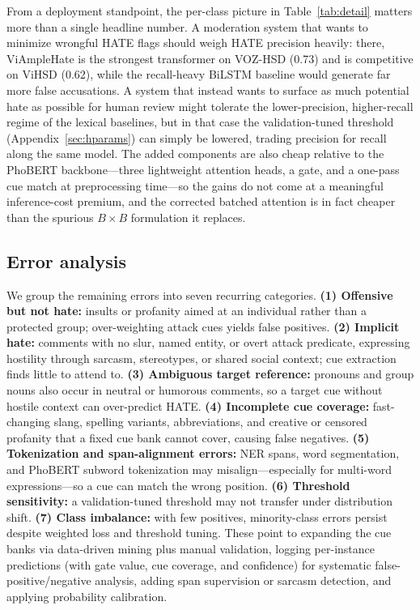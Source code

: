 \documentclass[11pt]{article}
\begin{document}
From a deployment standpoint, the per-class picture in Table~\ref{tab:detail} matters more than a single headline number. A moderation system that wants to minimize wrongful HATE flags should weigh HATE precision heavily: there, ViAmpleHate is the strongest transformer on VOZ-HSD (0.73) and is competitive on ViHSD (0.62), while the recall-heavy BiLSTM baseline would generate far more false accusations. A system that instead wants to surface as much potential hate as possible for human review might tolerate the lower-precision, higher-recall regime of the lexical baselines, but in that case the validation-tuned threshold (Appendix~\ref{sec:hparams}) can simply be lowered, trading precision for recall along the same model. The added components are also cheap relative to the PhoBERT backbone---three lightweight attention heads, a gate, and a one-pass cue match at preprocessing time---so the gains do not come at a meaningful inference-cost premium, and the corrected batched attention is in fact cheaper than the spurious $B\times B$ formulation it replaces.

\subsection{Error analysis}
We group the remaining errors into seven recurring categories. \textbf{(1) Offensive but not hate:} insults or profanity aimed at an individual rather than a protected group; over-weighting attack cues yields false positives. \textbf{(2) Implicit hate:} comments with no slur, named entity, or overt attack predicate, expressing hostility through sarcasm, stereotypes, or shared social context; cue extraction finds little to attend to. \textbf{(3) Ambiguous target reference:} pronouns and group nouns also occur in neutral or humorous comments, so a target cue without hostile context can over-predict HATE. \textbf{(4) Incomplete cue coverage:} fast-changing slang, spelling variants, abbreviations, and creative or censored profanity that a fixed cue bank cannot cover, causing false negatives. \textbf{(5) Tokenization and span-alignment errors:} NER spans, word segmentation, and PhoBERT subword tokenization may misalign---especially for multi-word expressions---so a cue can match the wrong position. \textbf{(6) Threshold sensitivity:} a validation-tuned threshold may not transfer under distribution shift. \textbf{(7) Class imbalance:} with few positives, minority-class errors persist despite weighted loss and threshold tuning. These point to expanding the cue banks via data-driven mining plus manual validation, logging per-instance predictions (with gate value, cue coverage, and confidence) for systematic false-positive/negative analysis, adding span supervision or sarcasm detection, and applying probability calibration.
\end{document}
